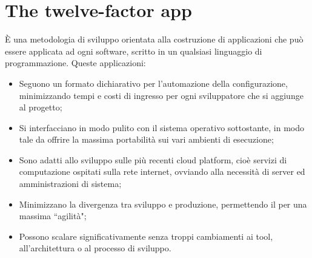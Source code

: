 \documentclass[NormeDiProgetto.tex]{subfiles}
\begin{document}
\chapter{The twelve-factor app}
\`{E} una metodologia di sviluppo orientata alla costruzione di applicazioni  che può essere applicata ad ogni software, scritto in un qualsiasi linguaggio di programmazione.
Queste applicazioni:
\begin{itemize}
\item Seguono un formato dichiarativo per l'automazione della configurazione, minimizzando tempi e costi di ingresso per ogni sviluppatore che si aggiunge al progetto;
\item Si interfacciano in modo pulito con il sistema operativo sottostante, in modo tale da offrire la massima portabilità sui vari ambienti di esecuzione;
\item Sono adatti allo sviluppo sulle più recenti cloud platform, cioè servizi di computazione ospitati sulla rete internet, ovviando alla necessità di server ed amministrazioni di sistema;
\item Minimizzano la divergenza tra sviluppo e produzione, permettendo il  per una massima \textquotedblleft agilità";
\item Possono scalare significativamente senza troppi cambiamenti ai tool, all'architettura o al processo di sviluppo.
\end{itemize}
\end{document}
